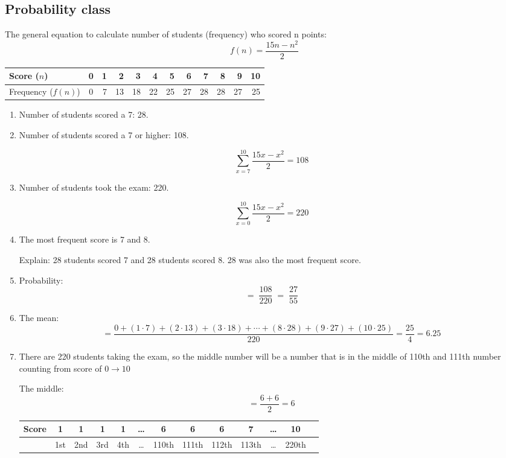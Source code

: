 \documentclass[12pt]{article}
\begin{document}
\subsection*{Probability class}
The general equation to calculate number of students (frequency) who scored n points: $$f(n)=\frac{15n-n^2}{2}$$ \par
\begin{center}
    \begin{tabular}{l | c*{10}r}
        Score ($n$) & 0 & 1 & 2 & 3 & 4 & 5 & 6 & 7 & 8 & 9 & 10 \\
        \hline
        Frequency ($f(n)$)
        &0 &7 &13 &18 &22 &25 &27 &28 &28 &27 &25 \\
    \end{tabular}
\end{center}


\begin{enumerate}
    \item Number of students scored a 7: 28.
        
    \item Number of students scored a 7 or higher: 108.\par
    $$\sum_{x=7}^{10}\frac{15x-x^2}{2}=108$$
        
    \item 
    Number of students took the exam: 220.\par
    $$\sum_{x=0}^{10}\frac{15x-x^2}{2}=220$$
            
        
    \item The most frequent score is 7 and 8. \par
    Explain: 28 students scored 7 and 28 students scored 8. 28 was also the most frequent score.
        

    \item Probability: $$=\;\frac{108}{220}\;=\;\frac{27}{55}$$
        
    \item The mean:
    $$=\frac{0+(1\cdot 7)+(2\cdot 13)+(3\cdot 18)+\cdots+(8\cdot 28)+(9\cdot 27)+(10\cdot 25)}{220}
    =\frac{25}{4}
    =6.25$$
        
    \item There are 220 students taking the exam, so the middle number will be a number that is in the middle of 110th and 111th number counting from score of $0 \to 10$\par
    The middle: $$=\frac{6+6}{2}=6$$
        
    \begin{center}
        \begin{tabular}{l |c|c|c|c|c|c|c|c|c|c|c| r}
            Score & 1 & 1 & 1 & 1 & \dots & 6 & 6 & 6 & 7 & \dots & 10 \\
            \hline
            &1st &2nd &3rd &4th &\dots &110th &111th &112th &113th &\dots &220th \\
        \end{tabular}
    \end{center}
        
\end{enumerate}
\end{document}
